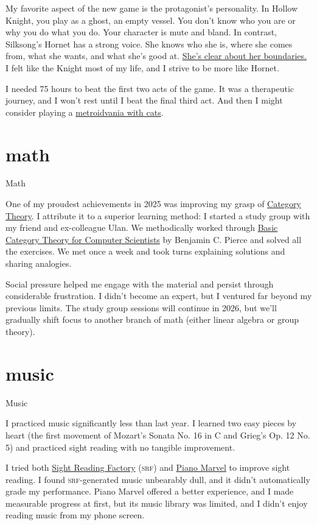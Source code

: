 \documentclass{article}
\begin{document}
My favorite aspect of the new game is the protagonist's personality.
In Hollow Knight, you play as a ghost, an empty vessel.
You don't know who you are or why you do what you do.
Your character is mute and bland.
In contrast, Silksong's Hornet has a strong voice.
She knows who she is,
where she comes from,
what she wants,
and what she's good at.
\href{https://youtu.be/T_g3EGclng4?si=Wfr-LOn77-zs8g40&t=14}{She's clear about her boundaries.}
I felt like the Knight most of my life,
and I strive to be more like Hornet.

I needed 75 hours to beat the first two acts of the game.
It was a therapeutic journey,
and I won't rest until I beat the final third act.
And then I might consider playing a \href{https://store.steampowered.com/app/1809540/Nine_Sols/}{metroidvania with cats}.

\section{math}{Math}

One of my proudest achievements in 2025
was improving my grasp of \href{https://en.wikipedia.org/wiki/Category_theory}{Category Theory}.
I attribute it to a superior learning method:
I started a study group with my friend and ex-colleague Ulan.
We methodically worked through \href{https://www.goodreads.com/book/show/1810837.Basic_Category_Theory_for_Computer_Scientists}{Basic Category Theory for Computer Scientists} by Benjamin C. Pierce and solved all the exercises.
We met once a week and took turns explaining solutions
and sharing analogies.


Social pressure helped me engage with the material
and persist through considerable frustration.
I didn't become an expert,
but I ventured far beyond my previous limits.
The study group sessions will continue in 2026,
but we'll gradually shift focus to another branch of math
(either linear algebra or group theory).

\section{music}{Music}

I practiced music significantly less than last year.
I learned two easy pieces by heart (the first movement of Mozart's Sonata No. 16 in C and Grieg's Op. 12 No. 5)
and practiced sight reading with no tangible improvement.

I tried both \href{https://www.sightreadingfactory.com/}{Sight Reading Factory} (\textsc{srf}) and \href{https://pianomarvel.com/en/}{Piano Marvel} to improve sight reading.
I found \textsc{srf}-generated music unbearably dull,
and it didn't automatically grade my performance.
Piano Marvel offered a better experience,
and I made measurable progress at first,
but its music library was limited,
and I didn't enjoy reading music from my phone screen.
\end{document}
